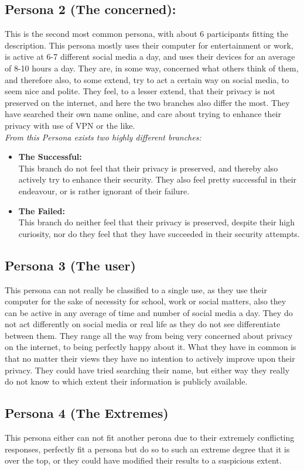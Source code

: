 \subsection{Persona 2 (The concerned):}
This is the second most common persona, with about 6 participants fitting the description.
This persona mostly uses their computer for entertainment or work, is active at 6-7 different social media a day,
and uses their devices for an average of 8-10 hours a day.
They are, in some way, concerned what others think of them, and therefore also, to some extend, try to act a certain way on social media, to seem nice and polite.
They feel, to a lesser extend, that their privacy is not preserved on the internet, and here the two branches also differ the most.
They have searched their own name online, and care about trying to enhance their privacy with use of VPN or the like.\\

\textit{From this Persona exists two highly different branches:}
\begin{itemize}
    \item 
    \textbf{The Successful:}\\
    This branch do not feel that their privacy is preserved, and thereby also actively try to enhance their security. They also feel pretty successful in their endeavour, or is rather ignorant of their failure.
    \item 
    \textbf{The Failed:}\\
    This branch do neither feel that their privacy is preserved, despite their high curiosity, nor do they feel that they have succeeded in their security attempts.
\end{itemize}

\subsection{Persona 3 (The user)}
This persona can not really be classified to a single use, as they use their computer for the sake of necessity for school, work or social matters, also they can be active in any average of time and number of social media a day.
They do not act differently on social media or real life as they do not see differentiate between them.
They range all the way from being very concerned about privacy on the internet, to being perfectly happy about it. What they have in common is that no matter their views they have no intention to actively improve upon their privacy.  
They could have tried searching their name, but either way they really do not know to which extent their information is publicly available.

\subsection{Persona 4 (The Extremes)}
This persona either can not fit another perona due to their extremely conflicting responses, perfectly fit a persona but do so to such an extreme degree that it is over the top, or they could have modified their results to a suspicious extent.